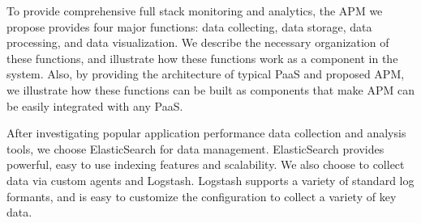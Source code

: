 \documentclass[11pt]{article}
\begin{document}
To provide comprehensive full stack monitoring and analytics, 
the APM we propose provides four major functions:
data collecting, data storage, data processing, and data visualization. 
We describe the necessary organization of
these functions, and illustrate how these functions work as 
a component in the system. Also, by providing the
architecture of typical PaaS and proposed APM, we illustrate how these functions can be built as components that
make APM can be easily integrated with any PaaS.

After investigating popular application performance data collection and analysis tools, we choose ElasticSearch for data management.
ElasticSearch provides powerful, easy to use indexing features and scalability. We also choose to collect data via custom agents and Logstash.
Logstash supports a variety of standard log formants,
and is easy to customize the configuration to collect a variety of key data.



\end{document}
